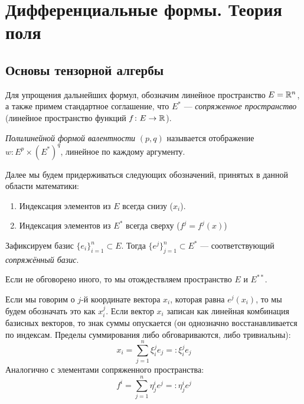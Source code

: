 \section{Дифференциальные формы. Теория поля}

\subsection{Основы тензорной алгербы}

\begin{note}
	Для упрощения дальнейших формул, обозначим линейное пространство $E = \mathbb{R}^n$, а также примем стандартное соглашение, что $E^*$ --- \textit{сопряженное пространство} (линейное пространство функций $f \colon E \to \mathbb{R}$).
\end{note}

\begin{definition}
	\textit{Полилинейной формой валентности} $(p, q)$ называется отображение $w \colon E^p \times (E^*)^q$, линейное по каждому аргументу.
\end{definition}

\begin{note}
	Далее мы будем придерживаться следующих обозначений, принятых в данной области математики:
	\begin{enumerate}
		\item Индексация элементов из $E$ всегда снизу ($x_i$).
		
		\item Индексация элементов из $E^*$ всегда сверху ($f^j = f^j(x)$)
	\end{enumerate}
\end{note}

\begin{note}
	Зафиксируем базис $\{e_i\}_{i = 1}^n \subset E$. Тогда $\{e^j\}_{j = 1}^n \subset E^*$ --- соответствующий \textit{сопряжённый базис}.
\end{note}

\begin{note}
	Если не обговорено иного, то мы отождествляем пространство $E$ и $E^{**}$.
\end{note}

\begin{note}
	Если мы говорим о $j$-й координате вектора $x_i$, которая равна $e^j(x_i)$, то мы будем обозначать это как $x_i^j$. Если вектор $x_i$ записан как линейная комбинация базисных векторов, то знак суммы опускается (он однозначно восстанавливается по индексам. Пределы суммирования либо обговариваются, либо тривиальны):
	\[
		x_i = \sum_{j = 1}^n \xi_i^j e_j =: \xi_i^j e_j
	\]
	Аналогично с элементами сопряженного пространства:
	\[
		f^i = \sum_{j = 1}^n \eta_j^i e^j =: \eta_j^i e^j
	\]
\end{note}


